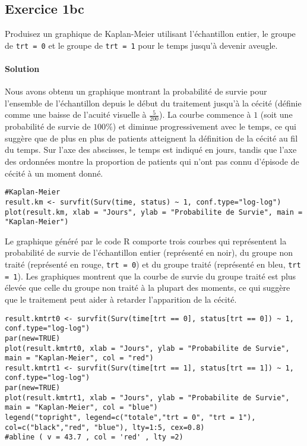 \documentclass[../main.tex]{subfiles}
\begin{document}
\begin{CJK*}{UTF8}{gbsn}

\section*{Exercice 1bc}
Produisez un graphique de Kaplan-Meier utilisant l'échantillon entier,
le groupe de \texttt{trt = 0} et le groupe de \texttt{trt = 1} 
pour le temps jusqu'à devenir aveugle.

\paragraph{Solution}

Nous avons obtenu un graphique montrant la probabilité de survie pour 
l'ensemble de l'échantillon depuis le début du traitement jusqu'à la cécité 
(définie comme une baisse de l'acuité visuelle à $\frac{5}{200}$). 
La courbe commence à $1$ (soit une probabilité de survie de $100 \%$) 
et diminue progressivement avec le temps, ce qui suggère que de plus en plus de patients atteignent 
la définition de la cécité au fil du temps. Sur l'axe des abscisses, le temps est indiqué en jours, 
tandis que l'axe des ordonnées montre la proportion de patients qui n'ont pas connu d'épisode de cécité à un moment donné.

\begin{lstlisting}
#Kaplan-Meier 
result.km <- survfit(Surv(time, status) ~ 1, conf.type="log-log")
plot(result.km, xlab = "Jours", ylab = "Probabilite de Survie", main = "Kaplan-Meier")

\end{lstlisting}

Le graphique généré par le code R comporte trois courbes 
qui représentent la probabilité de survie de l'échantillon entier (représenté en noir), 
du groupe non traité (représenté en rouge, \texttt{trt = 0}) 
et du groupe traité (représenté en bleu, \texttt{trt = 1}). 
Les graphiques montrent que la courbe de survie du groupe traité est 
plus élevée que celle du groupe non traité à la plupart des moments, 
ce qui suggère que le traitement peut aider à retarder l'apparition de la cécité.

\begin{lstlisting}
result.kmtrt0 <- survfit(Surv(time[trt == 0], status[trt == 0]) ~ 1, conf.type="log-log")
par(new=TRUE)
plot(result.kmtrt0, xlab = "Jours", ylab = "Probabilite de Survie", main = "Kaplan-Meier", col = "red")
result.kmtrt1 <- survfit(Surv(time[trt == 1], status[trt == 1]) ~ 1, conf.type="log-log")
par(new=TRUE)
plot(result.kmtrt1, xlab = "Jours", ylab = "Probabilite de Survie", main = "Kaplan-Meier", col = "blue")
legend("topright", legend=c("totale","trt = 0", "trt = 1"), col=c("black","red", "blue"), lty=1:5, cex=0.8)
#abline ( v = 43.7 , col = 'red' , lty =2)
\end{lstlisting}


\end{CJK*}
\end{document}

